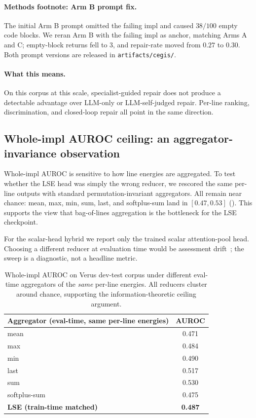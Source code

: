 \documentclass[10pt]{article}
\begin{document}
\paragraph{Methods footnote: Arm B prompt fix.} The initial Arm B
prompt omitted the failing impl and caused $38/100$ empty code blocks.
We reran Arm B with the failing impl as anchor, matching Arms A and C;
empty-block returns fell to $3$, and repair-rate moved from $0.27$ to
$0.30$. Both prompt versions are released in \texttt{artifacts/cegis/}.

\paragraph{What this means.}
On this corpus at this scale, specialist-guided repair does not
produce a detectable advantage over LLM-only or LLM-self-judged
repair. Per-line ranking, discrimination, and closed-loop repair all
point in the same direction.


\subsection{Whole-impl AUROC ceiling: an aggregator-invariance observation}
\label{sec:results:ceiling}

Whole-impl AUROC is sensitive to how line energies are aggregated. To
test whether the LSE head was simply the wrong reducer, we rescored the
same per-line outputs with standard permutation-invariant aggregators.
All remain near chance: mean, max, min, sum, last, and softplus-sum land
in $[0.47,0.53]$ (). This supports the view that
bag-of-lines aggregation is the bottleneck for the LSE checkpoint.

For the scalar-head hybrid we report only the trained scalar
attention-pool head. Choosing a different reducer at evaluation time
would be assessment drift~\cite{zhang2025lessonsprm}; the sweep is a
diagnostic, not a headline metric.

\begin{table}[htbp]
\centering
\caption{Whole-impl AUROC on Verus dev-test corpus under different eval-time
aggregators of the \emph{same} per-line energies. All reducers cluster
around chance, supporting the information-theoretic ceiling argument.}
\label{tab:agg-sweep}
\small
\begin{tabular}{lc}
\toprule
Aggregator (eval-time, same per-line energies) & AUROC \\
\midrule
mean                       & 0.471 \\
max                        & 0.484 \\
min                        & 0.490 \\
last                       & 0.517 \\
sum                        & 0.530 \\
softplus-sum               & 0.475 \\
\midrule
\textbf{LSE (train-time matched)} & \textbf{0.487} \\
\bottomrule
\end{tabular}
\end{table}
\end{document}
